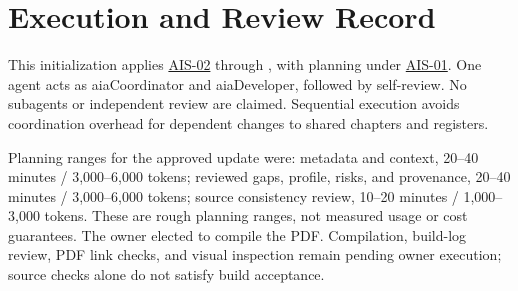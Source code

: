 \section{Execution and Review Record}
\label{Section:ProjectExecutionRecord}
This initialization applies \hyperref[Skill:AIS-02]{AIS-02} through
, with planning under
\hyperref[Skill:AIS-01]{AIS-01}. One agent acts as aiaCoordinator and
aiaDeveloper, followed by self-review. No subagents or independent review are
claimed. Sequential execution avoids coordination overhead for dependent
changes to shared chapters and registers.

Planning ranges for the approved update were: metadata and context,
20--40 minutes / 3,000--6,000 tokens; reviewed gaps, profile, risks, and
provenance, 20--40 minutes / 3,000--6,000 tokens; source consistency review,
10--20 minutes / 1,000--3,000 tokens. These are rough planning ranges, not
measured usage or cost guarantees. The owner elected to compile the PDF.
Compilation, build-log review, PDF link checks, and visual inspection remain
pending owner execution; source checks alone do not satisfy build acceptance.
